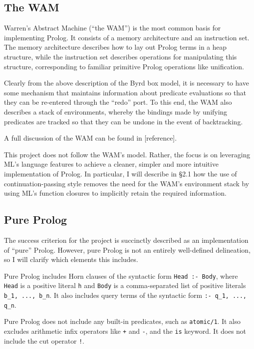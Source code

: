 \documentclass[12pt]{article}
\begin{document}
\subsection{The WAM}


Warren's Abstract Machine (``the WAM'') is the most common basis for implementing Prolog. 
It consists of a memory architecture and an instruction set. 
The memory architecture describes how to lay out Prolog terms in a heap structure, while the instruction set describes operations for manipulating this structure, corresponding to familiar primitive Prolog operations like unification. 

Clearly from the above description of the Byrd box model, it is necessary to have some mechanism that maintains information about predicate evaluations so that they can be re-entered through the ``redo'' port. 
To this end, the WAM also describes a stack of environments, whereby the bindings made by unifying predicates are tracked so that they can be undone in the event of backtracking. 

A full discussion of the WAM can be found in [reference].

This project does not follow the WAM's model. 
Rather, the focus is on leveraging ML's language features to achieve a cleaner, simpler and more intuitive implementation of Prolog. 
In particular, I will describe in \S2.1 how the use of continuation-passing style removes the need for the WAM's environment stack by using ML's function closures to implicitly retain the required information.

\subsection{Pure Prolog}

The success criterion for the project is succinctly described as an implementation of ``pure'' Prolog. 
However, pure Prolog is not an entirely well-defined delineation, so I will clarify which elements this includes.

Pure Prolog includes Horn clauses of the syntactic form \verb|Head :- Body|, where \verb|Head| is a positive literal \verb|h| and \verb|Body| is a comma-separated list of positive literals \verb|b_1, ..., b_n|. 
It also includes query terms of the syntactic form \verb|:- q_1, ..., q_n|.

Pure Prolog does not include any built-in predicates, such as \verb|atomic/1|. 
It also excludes arithmetic infix operators like \verb|+| and \verb|-|, and the \verb|is| keyword. 
It does not include the cut operator \verb|!|.
\end{document}
